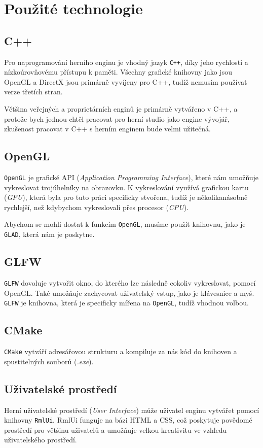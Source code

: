 \documentclass[12pt,a4paper]{article}
\begin{document}
\section{Použité technologie}

\subsection{C++}
Pro naprogramování herního enginu je vhodný jazyk \texttt{C++}, díky jeho rychlosti a nízkoúrovňovému přístupu k paměti. Všechny grafické knihovny jako jsou OpenGL a DirectX jsou primárně vyvíjeny pro C++, tudíž nemusím používat verze třetích stran.

Většina veřejných a proprietárních enginů je primárně vytvářeno v C++, a protože bych jednou chtěl pracovat pro herní studio jako engine vývojář, zkušenost pracovat v C++ s herním enginem bude velmi užitečná.

\subsection{OpenGL}
\texttt{OpenGL} je grafické API (\textit{Application Programming Interface}), které nám umožňuje vykreslovat trojúhelníky na obrazovku. K vykreslování využívá grafickou kartu (\textit{GPU}), která byla pro tuto práci specificky stvořena, tudíž je několikanásobně rychlejší, než kdybychom vykreslovali přes procesor (\textit{CPU}).

Abychom se mohli dostat k funkcím \texttt{OpenGL}, musíme použít knihovnu, jako je \texttt{GLAD}, která nám je poskytne.

\subsection{GLFW}
\texttt{GLFW} dovoluje vytvořit okno, do kterého lze následně cokoliv vykreslovat, pomocí OpenGL. Také umožňuje zachycovat uživatelský vstup, jako je klávesnice a myš. \texttt{GLFW} je knihovna, která je specificky mířena na \texttt{OpenGL}, tudíž vhodnou volbou.

\subsection{CMake}
\texttt{CMake} vytváří adresářovou strukturu a kompiluje za nás kód do knihoven a spustitelných souborů (\textit{.exe}).

\subsection{Uživatelské prostředí} \label{sec:tech-ui}
Herní uživatelské prostředí (\textit{User Interface}) může uživatel enginu vytvářet pomocí knihovny \texttt{RmlUi}. RmlUi funguje na bázi HTML a CSS, což poskytuje povědomé prostředí pro většinu uživatelů a umožňuje velkou kreativitu ve vzhledu uživatelského prostředí.
\end{document}
